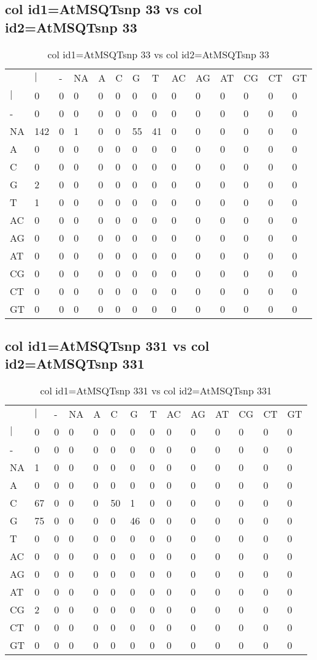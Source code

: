 \subsection{col id1=AtMSQTsnp 33 vs col id2=AtMSQTsnp 33}
\begin{center}
\begin{longtable}{|l|l|l|l|l|l|l|l|l|l|l|l|l|l|}
\caption{col id1=AtMSQTsnp 33 vs col id2=AtMSQTsnp 33} \label{table_dm662}\\
\hline
\\
\hline
&$|$&-&NA&A&C&G&T&AC&AG&AT&CG&CT&GT\\
$|$&0&0&0&0&0&0&0&0&0&0&0&0&0\\
-&0&0&0&0&0&0&0&0&0&0&0&0&0\\
NA&142&0&1&0&0&55&41&0&0&0&0&0&0\\
A&0&0&0&0&0&0&0&0&0&0&0&0&0\\
C&0&0&0&0&0&0&0&0&0&0&0&0&0\\
G&2&0&0&0&0&0&0&0&0&0&0&0&0\\
T&1&0&0&0&0&0&0&0&0&0&0&0&0\\
AC&0&0&0&0&0&0&0&0&0&0&0&0&0\\
AG&0&0&0&0&0&0&0&0&0&0&0&0&0\\
AT&0&0&0&0&0&0&0&0&0&0&0&0&0\\
CG&0&0&0&0&0&0&0&0&0&0&0&0&0\\
CT&0&0&0&0&0&0&0&0&0&0&0&0&0\\
GT&0&0&0&0&0&0&0&0&0&0&0&0&0\\
\hline
\end{longtable}
\end{center}

\subsection{col id1=AtMSQTsnp 331 vs col id2=AtMSQTsnp 331}
\begin{center}
\begin{longtable}{|l|l|l|l|l|l|l|l|l|l|l|l|l|l|}
\caption{col id1=AtMSQTsnp 331 vs col id2=AtMSQTsnp 331} \label{table_dm664}\\
\hline
\\
\hline
&$|$&-&NA&A&C&G&T&AC&AG&AT&CG&CT&GT\\
$|$&0&0&0&0&0&0&0&0&0&0&0&0&0\\
-&0&0&0&0&0&0&0&0&0&0&0&0&0\\
NA&1&0&0&0&0&0&0&0&0&0&0&0&0\\
A&0&0&0&0&0&0&0&0&0&0&0&0&0\\
C&67&0&0&0&50&1&0&0&0&0&0&0&0\\
G&75&0&0&0&0&46&0&0&0&0&0&0&0\\
T&0&0&0&0&0&0&0&0&0&0&0&0&0\\
AC&0&0&0&0&0&0&0&0&0&0&0&0&0\\
AG&0&0&0&0&0&0&0&0&0&0&0&0&0\\
AT&0&0&0&0&0&0&0&0&0&0&0&0&0\\
CG&2&0&0&0&0&0&0&0&0&0&0&0&0\\
CT&0&0&0&0&0&0&0&0&0&0&0&0&0\\
GT&0&0&0&0&0&0&0&0&0&0&0&0&0\\
\hline
\end{longtable}
\end{center}

